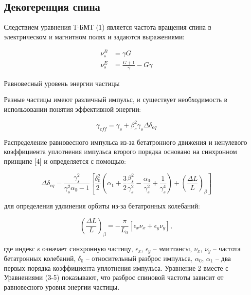\subsection{Декогеренция спина}\label{sec:EDM/Wien_filter_tracking/decoherence}

Следствием уравнения Т-БМТ (1) является частота вращения спина в электрическом и магнитном полях и задаются выражениями:

\begin{equation}
\begin{aligned}
\nu_{s}^{B} &= \gamma G \\
\nu_{s}^{E} &= \frac{G+1}{\gamma}-G \gamma
\end{aligned}
\end{equation}


\par Равновесный уровень энергии частицы

\par Разные частицы имеют различный импульс, и существует необходимость в использовании понятия эффективной энергии:

\begin{equation}
\gamma_{eff}=\gamma_s+\beta_s^2\gamma_s\Delta\delta_{eq}
\end{equation}

\par Распределение равновесного импульса из-за бетатронного движения и ненулевого коэффициента уплотнения импульса второго порядка основано на синхронном принципе [4] и определяется с помощью:

\begin{equation}
\Delta\delta_{eq}=\frac{\gamma_s^2}{\gamma_s^2\alpha_0-1}\left[\frac{\delta_0^2}{2}\left(\alpha_1+\frac{3}{2}\frac{\beta_s^2}{\gamma_s^2}-\frac{\alpha_0}{\gamma_s^2}+\frac{1}{\gamma_s^4}\right)+\left(\frac{\Delta L}{L}\right)_\beta\right]
\end{equation}

для определения удлинения орбиты из-за бетатронных колебаний:

\begin{equation}
\left(\frac{\Delta L}{L}\right)_\beta=-\frac{\pi}{L_0}\left[\epsilon_x\nu_x+\epsilon_y\nu_y\right],
\end{equation}

где индекс s означает синхронную частицу, $\epsilon_x$, $\epsilon_y$ – эмиттансы, $\nu_x$, $\nu_y$ – частота бетатронных колебаний, $\delta_0$ – относительный разброс импульса, $\alpha_0$, $\alpha_1$ – два первых порядка коэффициента уплотнения импульса. Уравнение 2 вместе с Уравнениями (3-5) показывают, что разброс спиновой частоты зависит от равновесного уровня энергии частицы.

